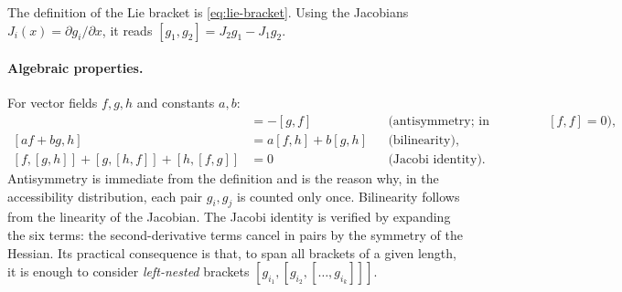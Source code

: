 The definition of the Lie bracket is \cref{eq:lie-bracket}. Using
the Jacobians \( J_i(x) = \partial g_i / \partial x \), it reads
\( [g_1, g_2] = J_2 g_1 - J_1 g_2 \).

\paragraph{Algebraic properties.}
For vector fields \( f, g, h \) and constants \( a, b \):
\begin{align}
    [f, g] &= -[g, f] && \text{(antisymmetry; in particular } [f,f]=0\text{)}, \\
    [af + bg, h] &= a[f, h] + b[g, h] && \text{(bilinearity)}, \\
    [f,[g,h]] + [g,[h,f]] + [h,[f,g]] &= 0 && \text{(Jacobi identity)}.
\end{align}
Antisymmetry is immediate from the definition and is the reason why, in
the accessibility distribution, each pair \( g_i, g_j \) is counted only
once. Bilinearity follows from the linearity of the Jacobian. The Jacobi
identity is verified by expanding the six terms: the second-derivative
terms cancel in pairs by the symmetry of the Hessian. Its practical
consequence is that, to span all brackets of a given length, it is
enough to consider \emph{left-nested} brackets
\( [g_{i_1}, [g_{i_2}, [\dots, g_{i_k}]]] \).

